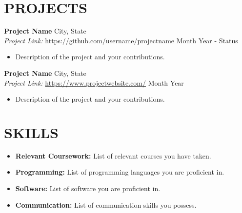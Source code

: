 \documentclass[a4paper,10pt]{extarticle}
\begin{document}
\section*{PROJECTS}
\noindent
\textbf{Project Name} \hfill City, State\\ %
\textit{Project Link:} \url{https://github.com/username/projectname} \hfill Month Year - Status %
\begin{itemize}
    \item Description of the project and your contributions. %
\end{itemize}

\noindent
\textbf{Project Name} \hfill City, State\\ %
\textit{Project Link:} \url{https://www.projectwebsite.com/} \hfill Month Year %
\begin{itemize}
    \item Description of the project and your contributions. %
\end{itemize}

\section*{SKILLS}
\begin{itemize}
    \item \textbf{Relevant Coursework:} List of relevant courses you have taken. %
    \item \textbf{Programming:} List of programming languages you are proficient in. %
    \item \textbf{Software:} List of software you are proficient in. %
    \item \textbf{Communication:} List of communication skills you possess. %
\end{itemize}

\end{document}
